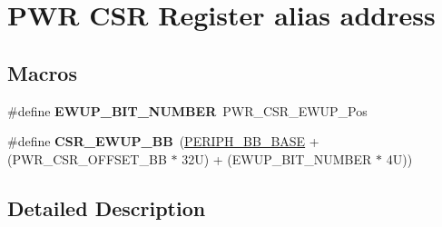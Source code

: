\hypertarget{group___p_w_r___c_s_r__register__alias}{}\section{P\+WR C\+SR Register alias address}
\label{group___p_w_r___c_s_r__register__alias}
\subsection*{Macros}
\begin{DoxyCompactItemize}
\item 
\mbox{\label{group___p_w_r___c_s_r__register__alias_gae006999c3cf61de12915df07eadb50f9}} 
\#define {\bfseries E\+W\+U\+P\+\_\+\+B\+I\+T\+\_\+\+N\+U\+M\+B\+ER}~P\+W\+R\+\_\+\+C\+S\+R\+\_\+\+E\+W\+U\+P\+\_\+\+Pos
\item 
\mbox{\label{group___p_w_r___c_s_r__register__alias_gaaff864595f697850b19173b0bca991b0}} 
\#define {\bfseries C\+S\+R\+\_\+\+E\+W\+U\+P\+\_\+\+BB}~(\hyperlink{group___peripheral__memory__map_gaed7efc100877000845c236ccdc9e144a}{P\+E\+R\+I\+P\+H\+\_\+\+B\+B\+\_\+\+B\+A\+SE} + (P\+W\+R\+\_\+\+C\+S\+R\+\_\+\+O\+F\+F\+S\+E\+T\+\_\+\+BB $\ast$ 32\+U) + (\+E\+W\+U\+P\+\_\+\+B\+I\+T\+\_\+\+N\+U\+M\+B\+E\+R $\ast$ 4\+U))
\end{DoxyCompactItemize}


\subsection{Detailed Description}
